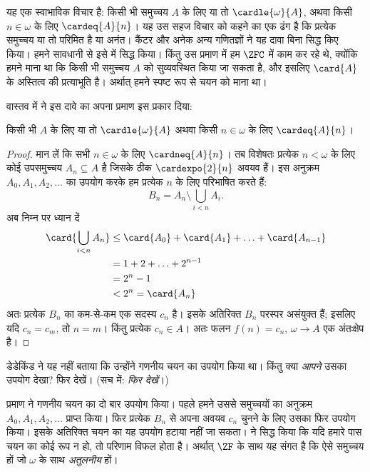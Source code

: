 \documentclass[../../../include/open-logic-section]{subfiles}
\begin{document}
\begin{ex}
यह एक स्वाभाविक विचार है: किसी भी समुच्चय $A$ के लिए या तो
$\cardle{\omega}{A}$, अथवा किसी $n\in\omega$ के लिए $\cardeq{A}{n}$। यह
उस सहज विचार को कहने का एक ढंग है कि प्रत्येक समुच्चय या तो परिमित है या
अनंत। कैंटर और अनेक अन्य गणितज्ञों ने यह दावा बिना सिद्ध किए किया। हमने
सावधानी से इसे  में
सिद्ध किया। किंतु उस प्रमाण में हम $\ZFC$ में काम कर रहे थे, क्योंकि हमने
माना था कि किसी भी समुच्चय $A$ को सुव्यवस्थित किया जा सकता है, और इसलिए
$\card{A}$ के अस्तित्व की प्रत्याभूति है। अर्थात् हमने स्पष्ट रूप से चयन को
माना था।

वास्तव में \citet{Dedekind1888} ने इस दावे का अपना प्रमाण इस प्रकार दिया:

\begin{thm}
किसी भी $A$ के लिए या तो $\cardle{\omega}{A}$ अथवा किसी $n\in\omega$ के
लिए $\cardeq{A}{n}$।
\end{thm}

\begin{proof}
मान लें कि सभी $n\in\omega$ के लिए $\cardneq{A}{n}$। तब विशेषतः प्रत्येक
$n<\omega$ के लिए कोई उपसमुच्चय $A_n\subseteq A$ है जिसके ठीक
$\cardexpo{2}{n}$ अवयव हैं। इस अनुक्रम $A_0,A_1,A_2,\ldots$ का उपयोग करके
हम प्रत्येक $n$ के लिए परिभाषित करते हैं:
\[
	B_n = A_n \setminus \bigcup_{i < n} A_i.
\]
अब निम्न पर ध्यान दें
\begin{align*}
	\card{\bigcup_{i < n}A_n} 
	&\leq \card{A_0} + \card{A_1} + \ldots + \card{A_{n-1}}\\
	&=1 + 2 + \ldots + 2^{n-1}\\
	& = 2^n - 1\\
	& < 2^n = \card{A_n}
\end{align*}
अतः प्रत्येक $B_n$ का कम-से-कम एक सदस्य $c_n$ है। इसके अतिरिक्त $B_n$
परस्पर असंयुक्त हैं; इसलिए यदि $c_n=c_m$, तो $n=m$। किंतु प्रत्येक
$c_n\in A$। अतः फलन $f(n)=c_n$, $\omega\to A$ एक अंतःक्षेप है।
\end{proof}
\noindent 
डेडेकिंड ने यह नहीं बताया कि उन्होंने गणनीय चयन का उपयोग किया था। किंतु क्या
\emph{आपने} उसका उपयोग देखा? फिर देखें। (सच में: \emph{फिर देखें}।)

प्रमाण ने गणनीय चयन का दो बार उपयोग किया। पहले हमने उससे समुच्चयों का अनुक्रम
$A_0,A_1,A_2,\dots$ प्राप्त किया। फिर प्रत्येक $B_n$ से अपना अवयव $c_n$
चुनने के लिए उसका फिर उपयोग किया। इसके अतिरिक्त चयन का यह उपयोग हटाया नहीं
जा सकता। \citet[p.~138]{Cohen1966} ने सिद्ध किया कि यदि हमारे पास चयन का
कोई रूप न हो, तो परिणाम विफल होता है। अर्थात् $\ZF$ के साथ यह संगत है कि ऐसे
समुच्चय हों जो $\omega$ के साथ \emph{अतुलनीय} हों।
\end{ex}
\end{document}
